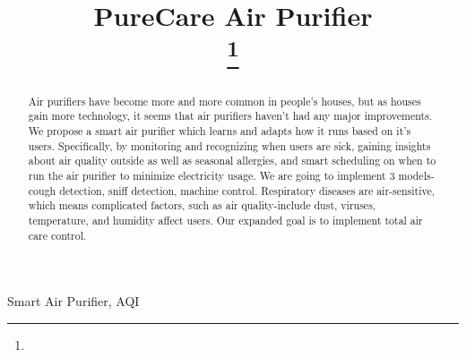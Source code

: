 \documentclass[conference]{IEEEtran}
\begin{document}
\title{PureCare Air Purifier\\

\thanks{}
}

\author{
\and
{}
\and
{}
\and
{}
}

\maketitle

\begin{abstract}
    Air purifiers have become more and more common in people's houses, but as houses gain more technology, it seems that air purifiers haven't had any major improvements. We propose a smart air purifier which learns and adapts how it runs based on it's users. Specifically, by monitoring and recognizing when users are sick, gaining insights about air quality outside as well as seasonal allergies, and smart scheduling on when to run the air purifier to minimize electricity usage.
    We are going to implement 3 models-cough detection, sniff detection, machine control. Respiratory diseases are air-sensitive, which means complicated factors, such as air quality-include dust, viruses, temperature, and humidity affect users. Our expanded goal is to implement total air care control. 
\end{abstract}

\begin{IEEEkeywords}
    Smart Air Purifier, AQI
\end{IEEEkeywords}
\end{document}
